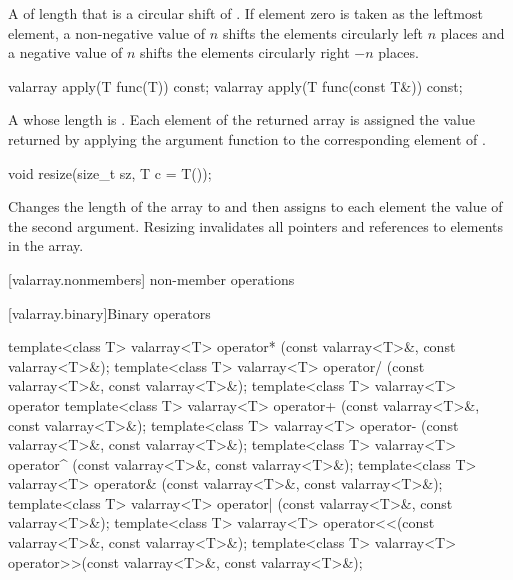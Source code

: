 \begin{itemdescr}
\pnum
\returns
A  of length 
that is a circular shift of . If element zero is taken as
the leftmost element, a non-negative value of $n$ shifts
the elements circularly left $n$ places and a negative
value of $n$ shifts the elements circularly right $-n$ places.
\end{itemdescr}

%
\begin{itemdecl}
valarray apply(T func(T)) const;
valarray apply(T func(const T&)) const;
\end{itemdecl}

\begin{itemdescr}
\pnum
\returns
A  whose length is .
Each element of the returned array is assigned
the value returned by applying the argument function to the
corresponding element of .
\end{itemdescr}

\begin{indexed}{}
\begin{itemdecl}
void resize(size_t sz, T c = T());
\end{itemdecl}
\end{indexed}

\begin{itemdescr}
\pnum
\effects
Changes the length of the  array to 
and then assigns to each element the value of the second argument.
Resizing invalidates all pointers and references to elements in the array.
\end{itemdescr}

[valarray.nonmembers]{ non-member operations}

[valarray.binary]{Binary operators}

%
%
%
%
%
%
%
%
%
%
\begin{itemdecl}
template<class T> valarray<T> operator* (const valarray<T>&, const valarray<T>&);
template<class T> valarray<T> operator/ (const valarray<T>&, const valarray<T>&);
template<class T> valarray<T> operator%
template<class T> valarray<T> operator+ (const valarray<T>&, const valarray<T>&);
template<class T> valarray<T> operator- (const valarray<T>&, const valarray<T>&);
template<class T> valarray<T> operator^ (const valarray<T>&, const valarray<T>&);
template<class T> valarray<T> operator& (const valarray<T>&, const valarray<T>&);
template<class T> valarray<T> operator| (const valarray<T>&, const valarray<T>&);
template<class T> valarray<T> operator<<(const valarray<T>&, const valarray<T>&);
template<class T> valarray<T> operator>>(const valarray<T>&, const valarray<T>&);
\end{itemdecl}


